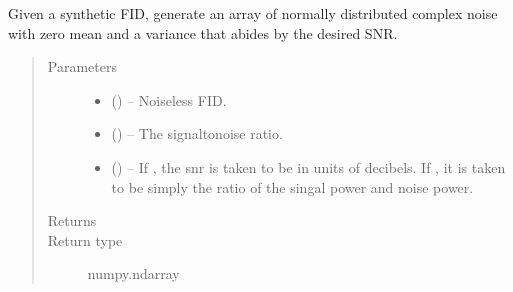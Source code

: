 \documentclass[letterpaper,10pt,english]{sphinxmanual}
\begin{document}

\begin{fulllineitems}
\label{\detokenize{references/sig:nmrespy.sig.make_noise}}
\sphinxAtStartPar
Given a synthetic FID, generate an array of normally distributed
complex noise with zero mean and a variance that abides by the desired
SNR.
\begin{quote}\begin{description}
\item[{Parameters}] \leavevmode\begin{itemize}
\item {} 
\sphinxAtStartPar
{} () – Noiseless FID.

\item {} 
\sphinxAtStartPar
{} () – The signal\sphinxhyphen{}to\sphinxhyphen{}noise ratio.

\item {} 
\sphinxAtStartPar
{} (\sphinxstyleliteralemphasis{\sphinxupquote{, }}) – If , the snr is taken to be in units of decibels. If ,
it is taken to be simply the ratio of the singal power and noise
power.

\end{itemize}

\item[{Returns}] \leavevmode
\sphinxAtStartPar
{}

\item[{Return type}] \leavevmode
\sphinxAtStartPar
numpy.ndarray

\end{description}\end{quote}

\end{fulllineitems}

\end{document}
